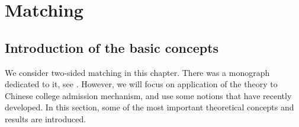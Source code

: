 
\chapter{Matching}  %

\label{Chapter4} %




\section{Introduction of the basic concepts}




 
 
We consider two-sided matching in this chapter. There was a monograph dedicated to it, see \parencite{Roth1990}. However, we will focus on application of the theory to Chinese college admission mechanism, and use some notions that have recently developed. In this section, some of the most important theoretical concepts and results are introduced. 

